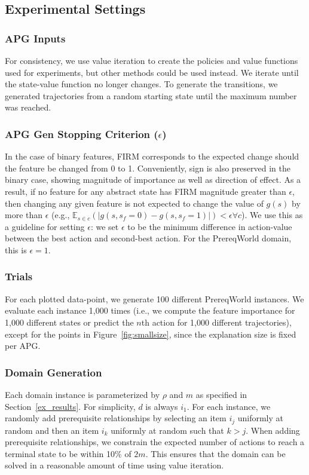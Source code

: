 \documentclass[letterpaper]{article} %
\begin{document}
\subsection{Experimental Settings} \label{em_settings}

\subsubsection{APG Inputs}
For consistency, we use value iteration \cite{SuttonAndBarto} to create the policies and value functions used for experiments, but other methods could be used instead. 
We iterate until the state-value function no longer changes. 
To generate the transitions, we generated trajectories from a random starting state until the maximum number was reached. 

\subsubsection{APG Gen Stopping Criterion ($\epsilon$)}
In the case of binary features, FIRM corresponds to the expected change should the feature be changed from 0 to 1. 
Conveniently, sign is also preserved in the binary case, showing magnitude of importance as well as direction of effect. 
As a result, if no feature for any abstract state has FIRM magnitude greater than $\epsilon$, then changing any given feature is not expected to change the value of $g(s)$ by more than $\epsilon$ (e.g., $\mathbb{E}_{s \in c} ( | g(s, s_f=0) - g(s, s_f=1) | ) < \epsilon \forall c$). 
We use this as a guideline for setting $\epsilon$: we set $\epsilon$ to be the minimum difference in action-value between the best action and second-best action. 
For the PrereqWorld domain, this is $\epsilon = 1$.

\subsubsection{Trials}
For each plotted data-point, we generate 100 different PrereqWorld instances.
We evaluate each instance 1,000 times (i.e., we compute the feature importance for 1,000 different states or predict the $n$th action for 1,000 different trajectories), except for the points in Figure~\ref{fig:smallsize}, since the explanation size is fixed per APG.

\subsubsection{Domain Generation}
Each domain instance is parameterized by $\rho$ and $m$ as specified in Section~\ref{ex_results}. 
For simplicity, $d$ is always $i_1$. 
For each instance, we randomly add prerequisite relationships by selecting an item $i_j$ uniformly at random and then an item $i_k$ uniformly at random such that $k>j$. When adding prerequisite relationships, we constrain the expected number of actions to reach a terminal state to be within 10\% of $2m$.
This ensures that the domain can be solved in a reasonable amount of time using value iteration.
\end{document}
